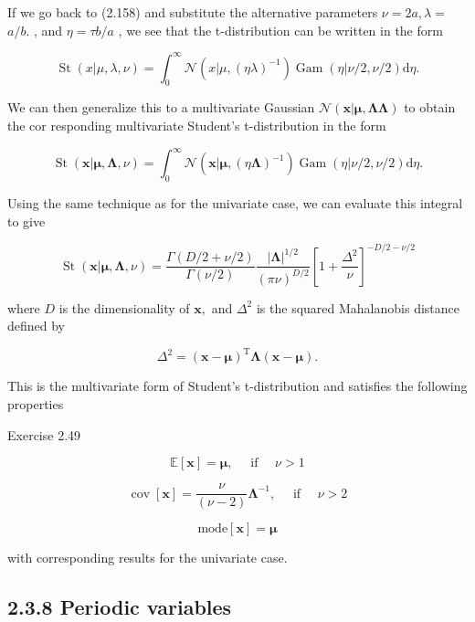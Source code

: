 \documentclass[
  10
]{article}
\begin{document}
If we go back to (2.158) and substitute the alternative parameters
\(\nu = 2 a , \lambda =\) \(a / b .\) , and \(\eta = \tau b / a\) , we
see that the t-distribution can be written in the form

\[
\operatorname{St} (x | \mu , \lambda , \nu) = \int_ {0} ^ {\infty} \mathcal {N} \left(x | \mu , (\eta \lambda) ^ {- 1}\right) \operatorname{Gam} (\eta | \nu / 2, \nu / 2) \mathrm{d} \eta .\tag{2.160}
\]

We can then generalize this to a multivariate Gaussian
\(\mathcal { N } ( \mathbf { x } | \boldsymbol { \mu } , \mathbf { \Lambda } \mathbf { \Lambda } )\)
to obtain the cor responding multivariate Student's t-distribution in
the form

\[
\operatorname{St} (\mathbf {x} | \boldsymbol {\mu}, \boldsymbol {\Lambda}, \nu) = \int_ {0} ^ {\infty} \mathcal {N} (\mathbf {x} | \boldsymbol {\mu}, (\eta \boldsymbol {\Lambda}) ^ {- 1}) \operatorname{Gam} (\eta | \nu / 2, \nu / 2) \mathrm{d} \eta .\tag{2.161}
\]

Using the same technique as for the univariate case, we can evaluate
this integral to give

\[
\operatorname{St} (\mathbf {x} | \boldsymbol {\mu}, \boldsymbol {\Lambda}, \nu) = \frac {\Gamma (D / 2 + \nu / 2)}{\Gamma (\nu / 2)} \frac {| \boldsymbol {\Lambda} | ^ {1 / 2}}{(\pi \nu) ^ {D / 2}} \left[ 1 + \frac {\Delta^ {2}}{\nu} \right] ^ {- D / 2 - \nu / 2}\tag{2.162}
\]

where \(D\) is the dimensionality of \(\mathbf { x } ,\) and
\(\Delta ^ { 2 }\) is the squared Mahalanobis distance defined by

\[
\Delta^ {2} = (\mathbf {x} - \boldsymbol {\mu}) ^ {\mathrm{T}} \boldsymbol {\Lambda} (\mathbf {x} - \boldsymbol {\mu}).\tag{2.163}
\]

This is the multivariate form of Student's t-distribution and satisfies
the following properties

Exercise 2.49

\[
\mathbb {E} [ \mathbf {x} ] = \boldsymbol {\mu}, \quad \text { if } \quad \nu > 1\tag{2.164}
\]

\[
\operatorname{cov} [ \mathbf {x} ] = \frac {\nu}{(\nu - 2)} \boldsymbol {\Lambda} ^ {- 1}, \quad \text { if } \quad \nu > 2\tag{2.165}
\]

\[
\mathrm{mode} [ \mathbf {x} ] = \boldsymbol {\mu}\tag{2.166}
\]

with corresponding results for the univariate case.

\subsection{2.3.8 Periodic variables}\label{periodic-variables}
\end{document}
